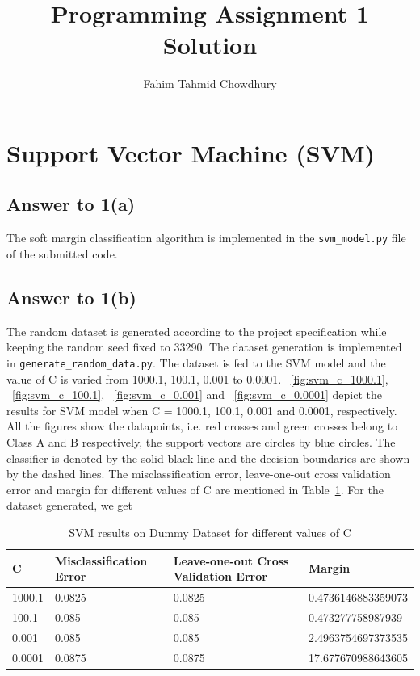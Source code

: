 \documentclass[runningheads]{llncs}
\begin{document}
%
\title{Programming Assignment 1 Solution}
\author{Fahim Tahmid Chowdhury}
\maketitle              %
%

\section{Support Vector Machine (SVM)}
\subsection{Answer to 1(a)}
The soft margin classification algorithm is implemented in the \texttt{svm\_model.py} file of the submitted code.

\subsection{Answer to 1(b)}
The random dataset is generated according to the project specification while keeping the random seed fixed to 33290.
The dataset generation is implemented in \texttt{generate\_random\_data.py}.
The dataset is fed to the SVM model and the value of C is varied from 1000.1, 100.1, 0.001 to 0.0001.
\figurename~\ref{fig:svm_c_1000.1}, \figurename~\ref{fig:svm_c_100.1}, \figurename~\ref{fig:svm_c_0.001} and
\figurename~\ref{fig:svm_c_0.0001} depict the results for SVM model when C = 1000.1, 100.1, 0.001 and 0.0001, respectively.
All the figures show the datapoints, i.e. red crosses and green crosses belong to Class A and B respectively,
the support vectors are circles by blue circles. The classifier is denoted by the solid black line and the decision boundaries are shown by the
dashed lines.
The misclassification error, leave-one-out cross validation error and margin for different values of C are mentioned in Table~\ref{tab:table_C}.
For the dataset generated, we get 

\begin{table}
\caption{SVM results on Dummy Dataset for different values of C}\label{tab:table_C}
\begin{tabular}{|l|l|l|l|}
\hline
C &  Misclassification Error & Leave-one-out Cross Validation Error & Margin\\
\hline
1000.1 & 0.0825 & 0.0825 & 0.4736146883359073\\
100.1 & 0.085 & 0.085 & 0.473277758987939\\
0.001 & 0.085 & 0.085 & 2.4963754697373535\\
0.0001 & 0.0875 & 0.0875 & 17.677670988643605\\
\hline
\end{tabular}
\end{table}
\end{document}
